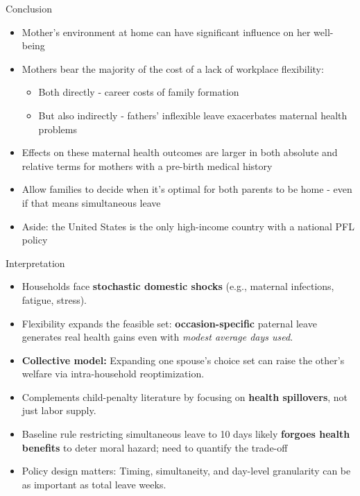 \documentclass[11pt,notes=hide,aspectratio=169,mathserif]{beamer}
\begin{document}
\begin{frame}{Conclusion}
\small
\begin{itemize}
    \item Mother’s environment at home can have significant influence on her well-being
  \item Mothers bear the majority of the cost of a lack of workplace flexibility:
    \begin{itemize}
        \item Both directly - career costs of family formation
        \item But also indirectly - fathers' inflexible leave exacerbates maternal health problems
    \end{itemize}
\item Effects on these maternal health outcomes are
larger in both absolute and relative terms for mothers with a pre-birth medical history
  \item Allow families to decide when it's optimal for both parents to be home - even if that means simultaneous leave
  \item Aside: the United States is the only high-income country with a national PFL policy 
\end{itemize}
\end{frame}


\begin{frame}{Interpretation}
\begin{itemize}
\item Households face \textbf{stochastic domestic shocks} (e.g., maternal infections, fatigue, stress).
\item Flexibility expands the feasible set: \textbf{occasion-specific} paternal leave generates real health gains even with \emph{modest average days used}.
  \item \textbf{Collective model:} Expanding one spouse’s choice set can raise the other’s welfare via intra-household reoptimization.
  \item Complements child-penalty literature by focusing on \textbf{health spillovers}, not just labor supply.
  \item Baseline rule restricting simultaneous leave to 10 days likely \textbf{forgoes health benefits} to deter moral hazard; need to quantify the trade-off
  \item Policy design matters: Timing, simultaneity, and day-level granularity can be as important as total leave weeks.
\end{itemize}
\end{frame}
\end{document}
